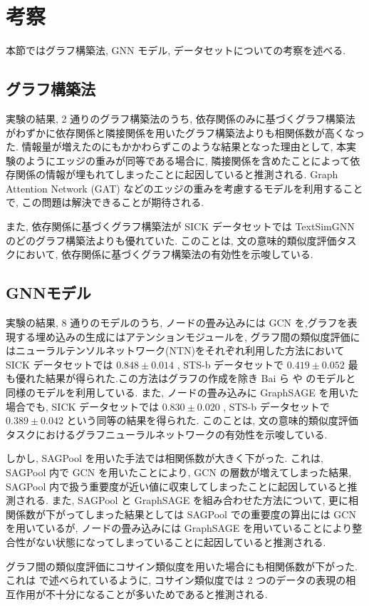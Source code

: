 \documentclass[a4j,twoside,12pt]{thesis} %
\begin{document}
\addtocounter{chapter}{+4}
\setlength{\baselineskip}{1.95zw}
\setlength{\textheight}{30\baselineskip}
\mainmatter

\fi

\chapter{考察}\label{dis}
本節ではグラフ構築法, GNN モデル, データセットについての考察を述べる.
\section{グラフ構築法}
実験の結果, 2 通りのグラフ構築法のうち, 依存関係のみに基づくグラフ構築法がわずかに依存関係と隣接関係を用いたグラフ構築法よりも相関係数が高くなった.
情報量が増えたのにもかかわらずこのような結果となった理由として, 本実験のようにエッジの重みが同等である場合に, 隣接関係を含めたことによって依存関係の情報が埋もれてしまったことに起因していると推測される. Graph Attention Network (GAT) などのエッジの重みを考慮するモデルを利用することで, この問題は解決できることが期待される.
\par また, 依存関係に基づくグラフ構築法が SICK データセットでは TextSimGNN \cite{zhou2020sentence} のどのグラフ構築法よりも優れていた. このことは, 文の意味的類似度評価タスクにおいて, 依存関係に基づくグラフ構築法の有効性を示唆している.
\section{GNNモデル}
実験の結果, 8 通りのモデルのうち, ノードの畳み込みには GCN\cite{kipf2017semi} を,グラフを表現する埋め込みの生成にはアテンションモジュール\cite{bai2019simgnn}を, グラフ間の類似度評価にはニューラルテンソルネットワーク(NTN)\cite{bai2019simgnn}をそれぞれ利用した方法において SICK データセットでは $0.848 \pm 0.014$ , STS-b データセットで $0.419 \pm 0.052$ 最も優れた結果が得られた.この方法はグラフの作成を除き Bai ら\cite{bai2019simgnn} や \cite{zhou2020sentence} のモデルと同様のモデルを利用している. また, ノードの畳み込みに GraphSAGE \cite{hamilton2017inductive} を用いた場合でも, SICK データセットでは $0.830 \pm 0.020$ , STS-b データセットで $0.389 \pm 0.042$ という同等の結果を得られた. このことは, 文の意味的類似度評価タスクにおけるグラフニューラルネットワークの有効性を示唆している.
\par しかし, SAGPool を用いた手法では相関係数が大きく下がった. これは, SAGPool 内で GCN を用いたことにより, GCN の層数が増えてしまった結果, SAGPool 内で扱う重要度が近い値に収束してしまったことに起因していると推測される. また, SAGPool と GraphSAGE を組み合わせた方法について, 更に相関係数が下がってしまった結果としては SAGPool での重要度の算出には GCN を用いているが, ノードの畳み込みには GraphSAGE を用いていることにより整合性がない状態になってしまっていることに起因していると推測される.
\par グラフ間の類似度評価にコサイン類似度を用いた場合にも相関係数が下がった.これは \cite{} で述べられているように, コサイン類似度では 2 つのデータの表現の相互作用が不十分になることが多いためであると推測される.
\end{document}
